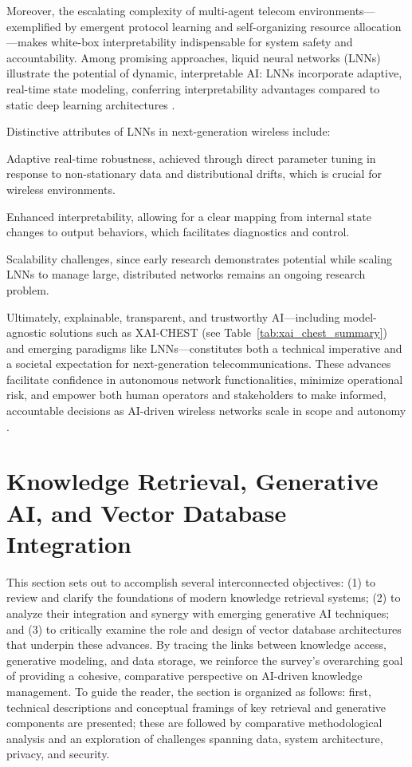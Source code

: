 \documentclass[sigconf]{acmart}
\begin{document}
Moreover, the escalating complexity of multi-agent telecom environments—exemplified by emergent protocol learning and self-organizing resource allocation—makes white-box interpretability indispensable for system safety and accountability. Among promising approaches, liquid neural networks (LNNs) illustrate the potential of dynamic, interpretable AI: LNNs incorporate adaptive, real-time state modeling, conferring interpretability advantages compared to static deep learning architectures \cite{ref35}.

Distinctive attributes of LNNs in next-generation wireless include:

Adaptive real-time robustness, achieved through direct parameter tuning in response to non-stationary data and distributional drifts, which is crucial for wireless environments.

Enhanced interpretability, allowing for a clear mapping from internal state changes to output behaviors, which facilitates diagnostics and control.

Scalability challenges, since early research demonstrates potential while scaling LNNs to manage large, distributed networks remains an ongoing research problem.

Ultimately, explainable, transparent, and trustworthy AI—including model-agnostic solutions such as XAI-CHEST (see Table~\ref{tab:xai_chest_summary}) and emerging paradigms like LNNs—constitutes both a technical imperative and a societal expectation for next-generation telecommunications. These advances facilitate confidence in autonomous network functionalities, minimize operational risk, and empower both human operators and stakeholders to make informed, accountable decisions as AI-driven wireless networks scale in scope and autonomy \cite{ref41}.

\section{Knowledge Retrieval, Generative AI, and Vector Database Integration}

This section sets out to accomplish several interconnected objectives: (1) to review and clarify the foundations of modern knowledge retrieval systems; (2) to analyze their integration and synergy with emerging generative AI techniques; and (3) to critically examine the role and design of vector database architectures that underpin these advances. By tracing the links between knowledge access, generative modeling, and data storage, we reinforce the survey's overarching goal of providing a cohesive, comparative perspective on AI-driven knowledge management. To guide the reader, the section is organized as follows: first, technical descriptions and conceptual framings of key retrieval and generative components are presented; these are followed by comparative methodological analysis and an exploration of challenges spanning data, system architecture, privacy, and security.
\end{document}
